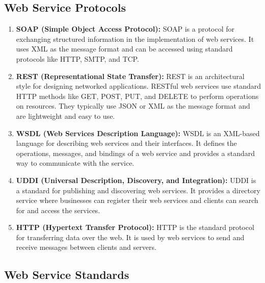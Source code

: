 \documentclass[11pt]{article}
\begin{document}
\subsection{Web Service Protocols}
\begin{enumerate}
    \item \textbf{SOAP (Simple Object Access Protocol):} SOAP is a protocol for exchanging structured information in the implementation of web services. It uses XML as the message format and can be accessed using standard protocols like HTTP, SMTP, and TCP.
    \item \textbf{REST (Representational State Transfer):} REST is an architectural style for designing networked applications. RESTful web services use standard HTTP methods like GET, POST, PUT, and DELETE to perform operations on resources. They typically use JSON or XML as the message format and are lightweight and easy to use.
    \item \textbf{WSDL (Web Services Description Language):} WSDL is an XML-based language for describing web services and their interfaces. It defines the operations, messages, and bindings of a web service and provides a standard way to communicate with the service.
    \item \textbf{UDDI (Universal Description, Discovery, and Integration):} UDDI is a standard for publishing and discovering web services. It provides a directory service where businesses can register their web services and clients can search for and access the services.
    \item \textbf{HTTP (Hypertext Transfer Protocol):} HTTP is the standard protocol for transferring data over the web. It is used by web services to send and receive messages between clients and servers.
\end{enumerate}

\subsection{Web Service Standards}
\end{document}

